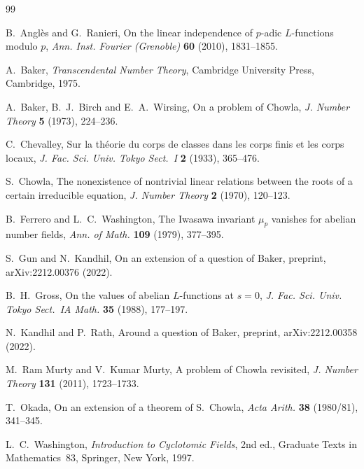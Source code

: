 \documentclass[11pt]{amsart}
\theoremstyle{definition}
\theoremstyle{remark}
\numberwithin{equation}{section}
\begin{document}
\begin{thebibliography}{99}

B.~Angl\`es and G.~Ranieri, On the linear independence of $p$-adic $L$-functions modulo $p$, \emph{Ann. Inst. Fourier (Grenoble)} \textbf{60} (2010), 1831--1855.

A.~Baker, \emph{Transcendental Number Theory}, Cambridge University Press, Cambridge, 1975.

A.~Baker, B.~J.~Birch and E.~A.~Wirsing, On a problem of Chowla, \emph{J. Number Theory} \textbf{5} (1973), 224--236.

C.~Chevalley, Sur la th\'eorie du corps de classes dans les corps finis et les corps locaux, \emph{J. Fac. Sci. Univ. Tokyo Sect.~I} \textbf{2} (1933), 365--476.

S.~Chowla, The nonexistence of nontrivial linear relations between the roots of a certain irreducible equation, \emph{J. Number Theory} \textbf{2} (1970), 120--123.

B.~Ferrero and L.~C.~Washington, The Iwasawa invariant $\mu_p$ vanishes for abelian number fields, \emph{Ann. of Math.} \textbf{109} (1979), 377--395.

S.~Gun and N.~Kandhil, On an extension of a question of Baker, preprint, arXiv:2212.00376 (2022).

B.~H.~Gross, On the values of abelian $L$-functions at $s=0$, \emph{J. Fac. Sci. Univ. Tokyo Sect.~IA Math.} \textbf{35} (1988), 177--197.

N.~Kandhil and P.~Rath, Around a question of Baker, preprint, arXiv:2212.00358 (2022).

M.~Ram Murty and V.~Kumar Murty, A problem of Chowla revisited, \emph{J. Number Theory} \textbf{131} (2011), 1723--1733.

T.~Okada, On an extension of a theorem of S.~Chowla, \emph{Acta Arith.} \textbf{38} (1980/81), 341--345.

L.~C.~Washington, \emph{Introduction to Cyclotomic Fields}, 2nd ed., Graduate Texts in Mathematics~83, Springer, New York, 1997.

\end{thebibliography}
\end{document}
